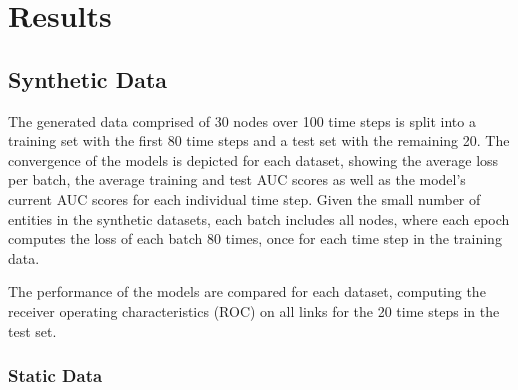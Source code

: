 \chapter{Results}\label{ch:Results}

\section{Synthetic Data}

The generated data comprised of 30 nodes over 100 time steps is split into a training set with the first 80 time steps and a test set with the remaining 20. 
The convergence of the models is depicted for each dataset, showing the average loss per batch, the average training and test AUC scores as well as the model's current AUC scores for each individual time step. 
Given the small number of entities in the synthetic datasets, each batch includes all nodes, where each epoch computes the loss of each batch 80 times, once for each time step in the training data. 


The performance of the models are compared for each dataset, computing the receiver operating characteristics (ROC) on all links for the 20 time steps in the test set.

\subsection{Static Data}

    
